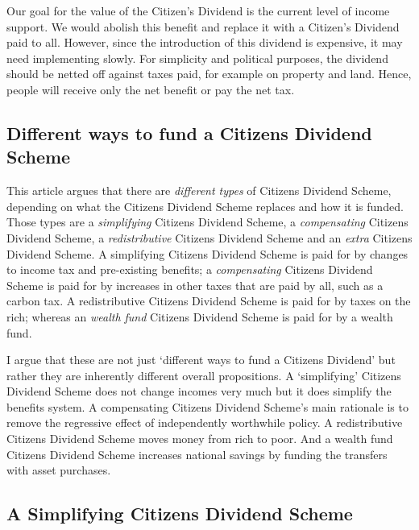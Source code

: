 \documentclass[]{tufte-handout}
\begin{document}
Our goal for the value of the Citizen's Dividend is the current level of
income support. We would abolish this benefit and replace it with a
Citizen's Dividend paid to all. However, since the introduction of this
dividend is expensive, it may need implementing slowly. For simplicity
and political purposes, the dividend should be netted off against taxes
paid, for example on property and land. Hence, people will receive only
the net benefit or pay the net tax.

\hypertarget{different-ways-to-fund-a-citizens-dividend-scheme}{%
\subsection{Different ways to fund a Citizens Dividend
Scheme}\label{different-ways-to-fund-a-citizens-dividend-scheme}}

This article argues that there are \emph{different types} of Citizens
Dividend Scheme, depending on what the Citizens Dividend Scheme replaces
and how it is funded. Those types are a \emph{simplifying} Citizens
Dividend Scheme, a \emph{compensating} Citizens Dividend Scheme, a
\emph{redistributive} Citizens Dividend Scheme and an \emph{extra}
Citizens Dividend Scheme. A simplifying Citizens Dividend Scheme is paid
for by changes to income tax and pre-existing benefits; a
\emph{compensating} Citizens Dividend Scheme is paid for by increases in
other taxes that are paid by all, such as a carbon tax. A redistributive
Citizens Dividend Scheme is paid for by taxes on the rich; whereas an
\emph{wealth fund} Citizens Dividend Scheme is paid for by a wealth
fund.

I argue that these are not just `different ways to fund a Citizens
Dividend' but rather they are inherently different overall propositions.
A `simplifying' Citizens Dividend Scheme does not change incomes very
much but it does simplify the benefits system. A compensating Citizens
Dividend Scheme's main rationale is to remove the regressive effect of
independently worthwhile policy. A redistributive Citizens Dividend
Scheme moves money from rich to poor. And a wealth fund Citizens
Dividend Scheme increases national savings by funding the transfers with
asset purchases.

\hypertarget{a-simplifying-citizens-dividend-scheme}{%
\subsection{A Simplifying Citizens Dividend
Scheme}\label{a-simplifying-citizens-dividend-scheme}}
\end{document}
